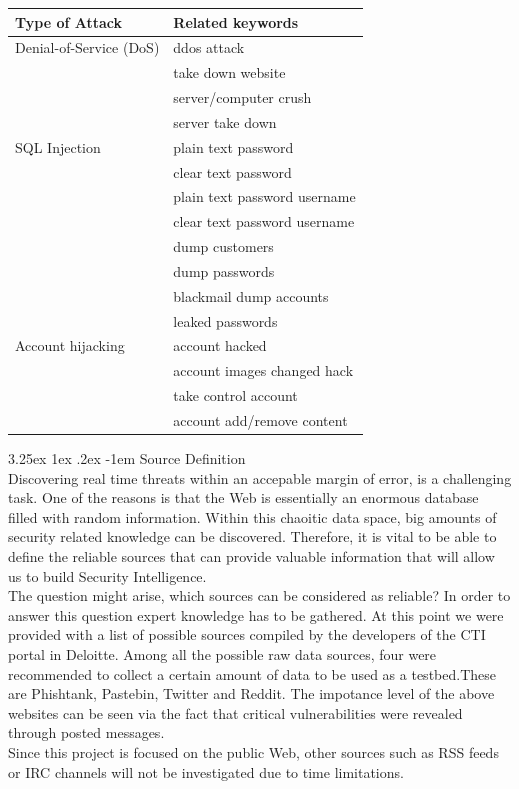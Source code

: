 \documentclass[12pt]{article}
\makeatletter
\renewcommand\paragraph{\@startsection{paragraph}{5}{\z@}%
  {3.25ex \@plus1ex \@minus.2ex}%
  {-1em}%
  {\normalfont\normalsize\bfseries}}
\makeatother
\begin{document}
\begin{center} 
\begin{longtable}{|l | l|}
\hline
Type of Attack & Related keywords \\
\hline
 Denial-of-Service (DoS) & ddos attack \\ 
 						& take down website \\ 
 						&  server/computer crush  \\
 						& server take down \\

\hline
SQL Injection 	& plain text password\\
				& clear text password \\
				& plain text password username \\
				& clear text password username\\
				& dump customers \\
				& dump passwords \\
				& blackmail dump accounts \\
				& leaked passwords \\
				
\hline
Account hijacking & account hacked \\
				  & account images changed hack \\
				  & take control account \\
				  & account add/remove content \\ 			  
\hline

\end{longtable}
\end{center}
\paragraph{Source Definition}
\hfill \break \\
Discovering real time threats within an accepable margin of error, is a challenging task. One of the reasons is that the Web is essentially an enormous database filled with random information. Within this chaoitic data space, big amounts of security related knowledge can be discovered. Therefore, it is vital to be able to define the reliable sources that can provide valuable information that will allow us to build Security Intelligence. 
\hfill \break \\
The question might arise, which sources can be considered as reliable? In order to answer this question expert knowledge has to be gathered. At this point we were provided with a list of possible sources compiled by the developers of the CTI portal in Deloitte. Among all the possible raw data sources, four were recommended to collect a certain amount of data to be used as a testbed.These are Phishtank, Pastebin, Twitter and Reddit. The impotance level of the above websites can be seen via the fact that critical vulnerabilities were revealed through posted messages\cite{list-2015-attacks}.\\
Since this project is focused on the public Web, other sources such as RSS feeds or IRC channels will not be investigated due to time limitations.   
\end{document}
